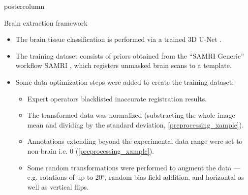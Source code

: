 \begin{frame}
\begin{columns}
\begin{column}{.42\textwidth}
\begin{beamercolorbox}[center]{postercolumn}
\begin{minipage}{.98\textwidth}
{%
                            \begin{myblock}{Brain extraction framework}
                                \begin{itemize}
                                    \item The brain tissue classification is performed via a trained 3D U-Net \cite{ronneberger_u-net:_2015}.
                                    \item The training dataset consists of priors obtained from the “SAMRI Generic” workflow \textcolor{lg}{SAMRI} \cite{irsabi}, which registers unmasked brain scans to a template.
                                    \item Some data optimization steps were added to create the training dataset:
                                    \begin{itemize}
                                        \item Expert operators blacklisted inaccurate registration results.
                                        \item The transformed data was normalized (substracting the whole image mean and dividing by the standard deviation, \cref{preprocessing_xample}).
                                        \item Annotations extending beyond the experimental data range were set to non-brain i.e. 0 (\cref{preprocessing_xample}).
                                        \item Some random transformations were performed to augment the data --- e.g. rotations of up to 20$^{\circ}$, random bias field addition, and horizontal as well as vertical flips.
                                    \end{itemize}
                                \end{itemize}

                                \vspace{1em}


\end{myblock}}
\end{minipage}
\end{beamercolorbox}
\end{column}
\end{columns}
\end{frame}
